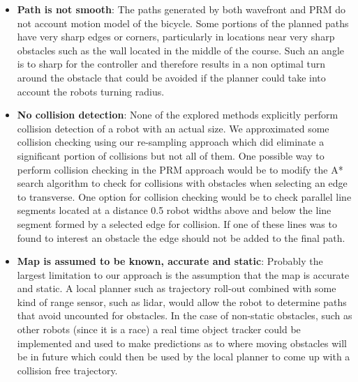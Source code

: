 \documentclass{article}
\begin{document}
\begin{itemize}
	\item{\textbf{Path is not smooth}: The paths generated by both wavefront and PRM do not account motion model of the bicycle. Some portions of the planned paths have very sharp edges or corners, particularly in locations near very sharp obstacles such as the wall located in the middle of the course. Such an angle is to sharp for the controller and therefore results in a non optimal turn around the obstacle that could be avoided if the planner could take into account the robots turning radius. 	
}
	
\item{\textbf{No collision detection}: None of the explored methods explicitly perform collision detection of a robot with an actual size. We approximated some collision checking using our re-sampling approach which did eliminate a significant portion of collisions but not all of them. One possible way to perform collision checking in the PRM approach would be to modify the A* search algorithm to check for collisions with obstacles when selecting an edge to transverse. One option for collision checking would be to check parallel line segments located at a distance 0.5 robot widths above and below the line segment formed by a selected edge for collision. If one of these lines was to found to interest an obstacle the edge should not be added to the final path.  
}

\item{\textbf{Map is assumed to be known, accurate and static}: Probably the largest limitation to our approach is the assumption that the map is accurate and static. A local planner such as trajectory roll-out combined with some kind of range sensor, such as lidar, would allow the robot to determine paths that avoid uncounted for obstacles. In the case of non-static obstacles, such as other robots (since it is a race) a real time object tracker could be implemented and used to make predictions as to where moving obstacles will be in future which could then be used by the local planner to come up with a collision free trajectory. 
}
	
\end{itemize}
\end{document}

